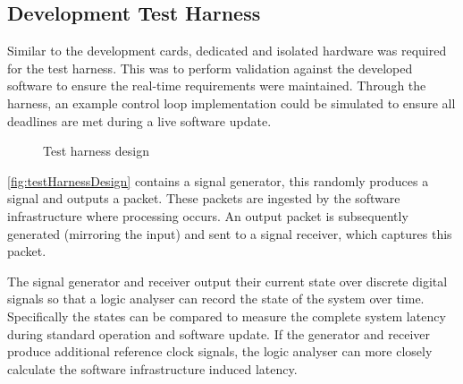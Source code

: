 \graphicspath{{main/design/hardware/graphics/}}

\subsection{Development Test Harness} \label{sec:testHarness}

Similar to the development cards, dedicated and isolated hardware was required for the test harness. This was to perform validation against the developed software to ensure the real-time requirements were maintained. Through the harness, an example control loop implementation could be simulated to ensure all deadlines are met during a live software update.

\begin{figure}[ht]
    \centering
    \caption[Test harness design]
    {Test harness design}
    \label{fig:testHarnessDesign}
\end{figure}

\autoref{fig:testHarnessDesign} contains a signal generator, this randomly produces a signal and outputs a packet. These packets are ingested by the software infrastructure where processing occurs. An output packet is subsequently generated (mirroring the input) and sent to a signal receiver, which captures this packet.

The signal generator and receiver output their current state over discrete digital signals so that a logic analyser can record the state of the system over time. Specifically the states can be compared to measure the complete system latency during standard operation and software update. If the generator and receiver produce additional reference clock signals, the logic analyser can more closely calculate the software infrastructure induced latency.

